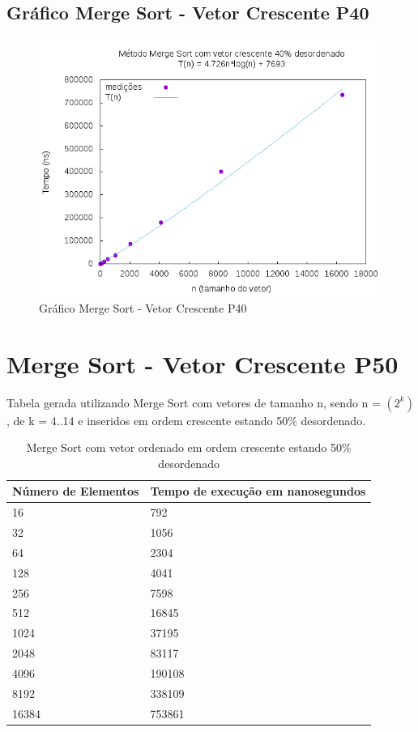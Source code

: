 \documentclass[12pt,a4paper,twoside]{report}
\begin{document}
\subsection{Gráfico Merge Sort - Vetor Crescente P40}
\begin{figure}[H]
    \centering
    \includegraphics[width=0.7\linewidth]{graficos/MergeSort/vIntCrescenteP40/vIntCrescenteP40.png}
  \caption{Gráfico Merge Sort - Vetor Crescente P40}
\end{figure}

\section{Merge Sort - Vetor Crescente P50}
Tabela gerada utilizando Merge Sort com vetores de tamanho n, sendo n = $(2^k)$, de k = 4..14 e inseridos em ordem crescente estando 50\% desordenado.
\begin{table}[H]
\centering
\caption{Merge Sort com vetor ordenado em ordem crescente estando 50\% desordenado}
\label{my-label}
\begin{tabular}{|l|l|}
\hline
\multicolumn{1}{|c|}{\textbf{Número de Elementos}} & \multicolumn{1}{c|}{\textbf{Tempo de execução em nanosegundos}} \\ \hline
16 & 792 \\ \hline
32 & 1056 \\ \hline
64 & 2304 \\ \hline
128 & 4041 \\ \hline
256 & 7598 \\ \hline
512 & 16845 \\ \hline
1024 & 37195 \\ \hline
2048 & 83117 \\ \hline
4096 & 190108 \\ \hline
8192 & 338109 \\ \hline
16384 & 753861 \\ \hline
\end{tabular}
\end{table}
\end{document}
